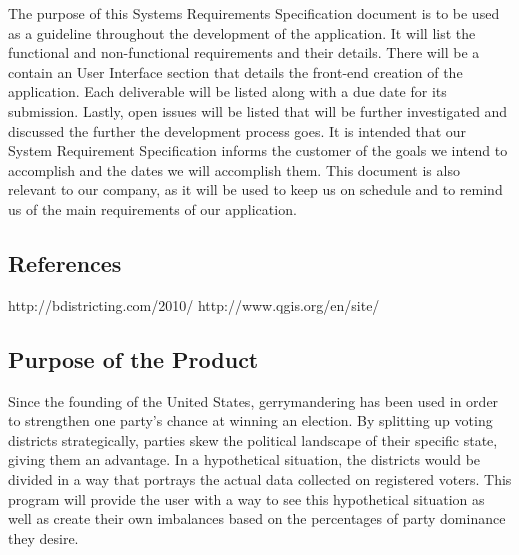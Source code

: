 \documentclass{article}
\begin{document}
\vspace{2.5mm}

\begin{addmargin}[4em]{0em}

The purpose of this Systems Requirements Specification document is to be used as a guideline throughout the development of the application. It will list the functional and non-functional requirements and their details. There will be a contain an User Interface section that details the front-end creation of the application. Each deliverable will be listed along with a due date for its submission. Lastly, open issues will be listed that will be further investigated and discussed the further the development process goes. It is intended that our System Requirement Specification informs the customer of the goals we intend to accomplish and the dates we will accomplish them. This document is also relevant to our company, as it will be used to keep us on schedule and to remind us of the main requirements of our application.

\end{addmargin}

\vspace{2.5mm}


\subsection{References}

\vspace{2.5mm}

\begin{addmargin}[4em]{0em}

http://bdistricting.com/2010/
http://www.qgis.org/en/site/

\end{addmargin}

\vspace{2.5mm}


\subsection{Purpose of the Product}

\vspace{2.5mm}

\begin{addmargin}[4em]{0em}

Since the founding of the United States, gerrymandering has been used in order to strengthen one party's chance at winning an election. By splitting up voting districts strategically, parties skew the political landscape of their specific state, giving them an advantage. In a hypothetical situation, the districts would be divided in a way that portrays the actual data collected on registered voters. This program will provide the user with a way to see this hypothetical situation as well as create their own imbalances based on the percentages of party dominance they desire.

\vspace{2.5mm}

\end{addmargin}
\end{document}
